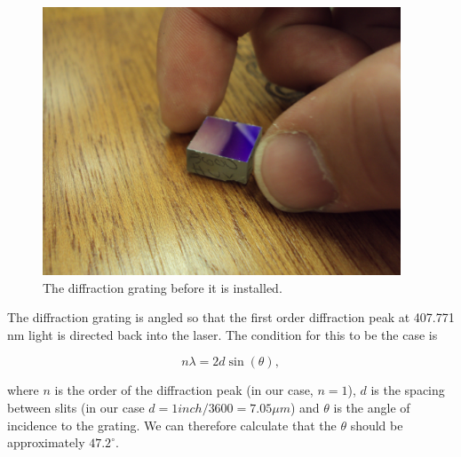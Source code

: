 \begin{figure}
\centerline{
\includegraphics[width=0.95\textwidth]{diffractionGrating.JPG}}
\caption[Photograph of Diffraction Grating]{\label{diffractionGratingPhoto} The diffraction grating before it is installed.}
\end{figure}

The diffraction grating is angled so that the first order diffraction peak at 407.771 nm light is directed back into the laser. The condition for this to be the case is 

\begin{equation} \label{gratingEQn}
n \lambda = 2 d \sin (\theta),
\end{equation}

where $n$ is the order of the diffraction peak (in our case, $n=1$), $d$ is the spacing between slits (in our case $d=1 inch/3600 = 7.05 \mu m$) and $\theta$ is the angle of incidence to the grating. We can therefore calculate that the $\theta$ should be approximately
\href{http://www.wolframalpha.com/input/?i=arcsin%28+407.771+nm+%2F%282*%281+mm%2F3600%29%29%29+in+degrees}{$47.2^\circ$}.

